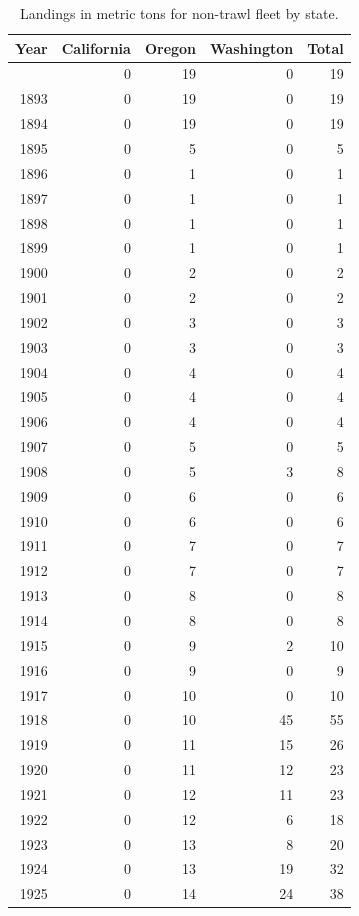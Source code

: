 \documentclass[
]{scrartcl}
\begin{document}
\begin{longtable}{rrrrr}

\caption{\label{tbl-NT_landings}Landings in metric tons for non-trawl
fleet by state.}

\tabularnewline

\toprule
Year & California & Oregon & Washington & Total \\ 
\midrule\addlinespace[2.5pt]
1892 & 0 & 19 & 0 & 19 \\ 
1893 & 0 & 19 & 0 & 19 \\ 
1894 & 0 & 19 & 0 & 19 \\ 
1895 & 0 & 5 & 0 & 5 \\ 
1896 & 0 & 1 & 0 & 1 \\ 
1897 & 0 & 1 & 0 & 1 \\ 
1898 & 0 & 1 & 0 & 1 \\ 
1899 & 0 & 1 & 0 & 1 \\ 
1900 & 0 & 2 & 0 & 2 \\ 
1901 & 0 & 2 & 0 & 2 \\ 
1902 & 0 & 3 & 0 & 3 \\ 
1903 & 0 & 3 & 0 & 3 \\ 
1904 & 0 & 4 & 0 & 4 \\ 
1905 & 0 & 4 & 0 & 4 \\ 
1906 & 0 & 4 & 0 & 4 \\ 
1907 & 0 & 5 & 0 & 5 \\ 
1908 & 0 & 5 & 3 & 8 \\ 
1909 & 0 & 6 & 0 & 6 \\ 
1910 & 0 & 6 & 0 & 6 \\ 
1911 & 0 & 7 & 0 & 7 \\ 
1912 & 0 & 7 & 0 & 7 \\ 
1913 & 0 & 8 & 0 & 8 \\ 
1914 & 0 & 8 & 0 & 8 \\ 
1915 & 0 & 9 & 2 & 10 \\ 
1916 & 0 & 9 & 0 & 9 \\ 
1917 & 0 & 10 & 0 & 10 \\ 
1918 & 0 & 10 & 45 & 55 \\ 
1919 & 0 & 11 & 15 & 26 \\ 
1920 & 0 & 11 & 12 & 23 \\ 
1921 & 0 & 12 & 11 & 23 \\ 
1922 & 0 & 12 & 6 & 18 \\ 
1923 & 0 & 13 & 8 & 20 \\ 
1924 & 0 & 13 & 19 & 32 \\ 
1925 & 0 & 14 & 24 & 38 \\ 

\end{longtable}
\end{document}
